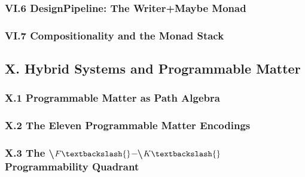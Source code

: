 \documentclass{article[11pt,letterpaper]}
\begin{document}

\subsubsection{VI.6 DesignPipeline: The Writer+Maybe Monad}
\label{sec:vi6-designpipeline-the-writermaybe-monad}


\subsubsection{VI.7 Compositionality and the Monad Stack}
\label{sec:vi7-compositionality-and-the-monad-stack}


\subsection{X. Hybrid Systems and Programmable Matter}
\label{sec:x-hybrid-systems-and-programmable-matter}


\subsubsection{X.1 Programmable Matter as Path Algebra}
\label{sec:x1-programmable-matter-as-path-algebra}


\subsubsection{X.2 The Eleven Programmable Matter Encodings}
\label{sec:x2-the-eleven-programmable-matter-encodings}


\subsubsection{X.3 The \textbackslash{}$F\textbackslash{}$–\textbackslash{}$K\textbackslash{}$ Programmability Quadrant}
\label{sec:x3-the-fk-programmability-quadrant}

\end{document}
